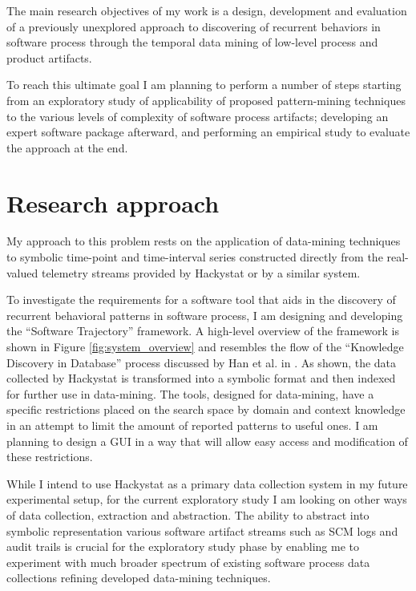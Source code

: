 \documentclass{sig-alternate}
\begin{document}
The main research objectives of my work is a design, development and evaluation of a previously unexplored approach to discovering of recurrent behaviors in software process through the temporal data mining of low-level process and product artifacts. 

To reach this ultimate goal I am planning to perform a number of steps starting from an exploratory study of applicability of proposed pattern-mining techniques to the various levels of complexity of software process artifacts; developing an expert software package afterward, and performing an empirical study to evaluate the approach at the end.

\section{Research approach}
My approach to this problem rests on the application of data-mining techniques to symbolic time-point and time-interval series constructed directly from the real-valued telemetry streams provided by Hackystat or by a similar system.

To investigate the requirements for a software tool that aids in the discovery of recurrent behavioral patterns in software process, I am designing and developing the ``Software Trajectory'' framework. A high-level overview of the framework is shown in Figure \ref{fig:system_overview} and resembles the flow of the ``Knowledge Discovery in Database'' process discussed by Han et al. in \cite{citeulike:709476}. As shown, the data collected by Hackystat is transformed into a symbolic format and then indexed for further use in data-mining. The tools, designed for data-mining, have a specific restrictions placed on the search space by domain and context knowledge in an attempt to limit the amount of reported patterns to useful ones. I am planning to design a GUI in a way that will allow easy access and modification of these restrictions. 

While I intend to use Hackystat as a primary data collection system in my future experimental setup, for the current exploratory study I am looking on other ways of data collection, extraction and abstraction. The ability to abstract into symbolic representation various software artifact streams such as SCM logs and audit trails is crucial for the exploratory study phase by enabling me to experiment with much broader spectrum of existing software process data collections refining developed data-mining techniques.
\end{document}
